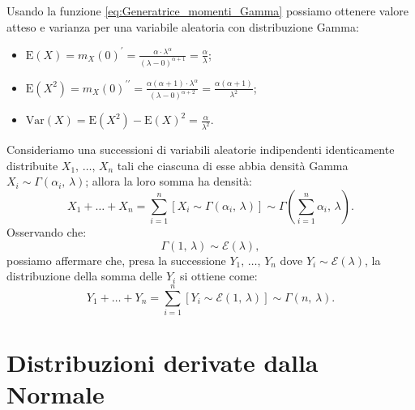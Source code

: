         \begin{defn}
            Usando la funzione \eqref{eq:Generatrice_momenti_Gamma} possiamo ottenere valore atteso e varianza per una variabile aleatoria con distribuzione Gamma:
            \begin{itemize}
                \item $\text{E}(X) = m_X(0)^{\prime} = 
                    \frac{\alpha\cdot \lambda^{\alpha}}{(\lambda-0)^{\alpha+1}} = 
                    \frac{\alpha}{\lambda}$;
                \item $\text{E}(X^2) = m_X(0)^{\prime\prime} = 
                    \frac{\alpha(\alpha+1)\cdot \lambda^{\alpha}}{(\lambda-0)^{\alpha+2}} = 
                    \frac{\alpha(\alpha+1)}{\lambda^2}$;
                \item $\text{Var}(X) = \text{E}(X^2) - \text{E}(X)^2 = \frac{\alpha}{\lambda^2}$.
            \end{itemize}
        \end{defn}
        \begin{defn}
            Consideriamo una successioni di variabili aleatorie indipendenti identicamente distribuite $X_1,\, \ldots,\, X_{n}$ tali che ciascuna di esse abbia densità Gamma  $X_i \sim \Gamma(\alpha_i,\, \lambda)$; allora la loro somma ha densità: \[
                X_1 + \ldots + X_{n} = \sum_{i=1}^{n} \left[X_i \sim \Gamma(\alpha_i,\, \lambda)\right] \sim \Gamma\left(\sum_{i=1}^n \alpha_i,\, \lambda\right)
            .\] Osservando che: \[
            \Gamma(1,\, \lambda) \sim \mathcal{E}(\lambda)
        ,\] possiamo affermare che, presa la successione $Y_1,\, \ldots,\, Y_{n}$ dove $Y_i \sim \mathcal{E}(\lambda)$, la distribuzione della somma delle $Y_i$ si ottiene come: \[
        Y_1 + \ldots + Y_{n} = \sum_{i=1}^n \left[Y_i \sim \mathcal{E}(1,\, \lambda)\right] \sim \Gamma(n,\, \lambda)
        .\] 
        \end{defn}
    \section{Distribuzioni derivate dalla Normale}
